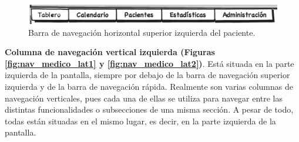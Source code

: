 \documentclass[a4paper,oneside,11pt]{book}
\begin{document}
			\begin{figure}[H]
			  \centering
			    \includegraphics[width=15cm]{img/jpg/nav/medico_sup1.jpg}
			  \caption{Barra de navegación horizontal superior izquierda del paciente.}
			  \label{fig:nav_medico_sup1}
			\end{figure}
			
			\bigskip
			\bigskip
			\bigskip
			\textbf{Columna de navegación vertical izquierda (Figuras \ref{fig:nav_medico_lat1} y \ref{fig:nav_medico_lat2})}. Está situada en la parte izquierda de la pantalla, siempre por debajo de la barra de navegación superior izquierda y de la barra de navegación rápida. Realmente son varias columnas de navegación verticales, pues cada una de ellas se utiliza para navegar entre las distintas funcionalidades o subsecciones de una misma sección. A pesar de todo, todas están situadas en el mismo lugar, es decir, en la parte izquierda de la pantalla.
			
			
\end{document}
